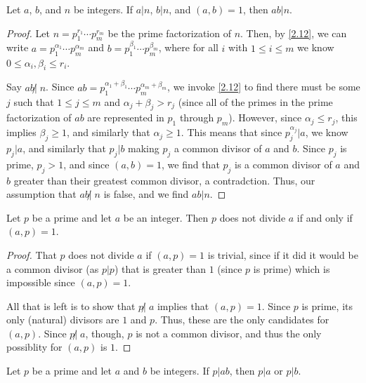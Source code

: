 \documentclass[../main.tex]{subfiles}
\begin{document}
\begin{thm} \label{2.25}
  Let $a$, $b$, and $n$ be integers. If $a|n$, $b|n$, and $(a, b) = 1$, then $ab | n$.
\end{thm}

\begin{proof}
  Let $n = p_1^{r_1} \cdots p_m^{r_m}$ be the prime factorization of $n$. Then, by \ref{2.12}, we can write $a = p_1^{\alpha_1} \cdots p_m^{\alpha_m}$ and $b = p_1^{\beta_1} \cdots p_m^{\beta_m}$, where for all $i$ with $1 \leq i \leq m$ we know $0 \leq \alpha_i, \beta_i \leq r_i$.

  Say $ab \not | \; n$. Since $ab = p_1^{\alpha_1 + \beta_1} \cdots p_m^{\alpha_m + \beta_m}$, we invoke \ref{2.12} to find there must be some $j$ such that $1 \leq j \leq m$ and $\alpha_j + \beta_j > r_j$ (since all of the primes in the prime factorization of $ab$ are represented in $p_1$ through $p_m$). However, since $\alpha_j \leq r_j$, this implies $\beta_j \geq 1$,
  and similarly that $\alpha_j \geq 1$. This means that since $p_j^{\alpha_j} | a$, we know $p_j | a$, and similarly that $p_j | b$ making $p_j$ a common divisor of $a$ and $b$. Since $p_j$ is prime, $p_j > 1$, and since $(a,b) = 1$, we find that $p_j$ is a common divisor of $a$ and $b$ greater than their greatest common divisor, a contradction. Thus, our assumption that $ab \not | \; n$ is false, and we find $ab | n$.
\end{proof}



\begin{thm} \label{2.26}
  Let $p$ be a prime and let $a$ be an integer. Then $p$ does not divide $a$ if and only if $(a, p) = 1$.
\end{thm}

\begin{proof}
  That $p$ does not divide $a$ if $(a, p) = 1$ is trivial, since if it did it would be a common divisor (as $p | p$) that is greater than $1$ (since $p$ is prime) which is impossible since $(a, p) = 1$.

  All that is left is to show that $p \not | \; a$ implies that $(a, p) = 1$. Since $p$ is prime, its only (natural) divisors are $1$ and $p$. Thus, these are the only candidates for $(a, p)$. Since $p \not | \; a$, though, $p$ is not a common divisor, and thus the only possiblity for $(a, p)$ is $1$.
\end{proof}



\begin{thm} \label{2.27}
  Let $p$ be a prime and let $a$ and $b$ be integers. If $p | ab$, then $p | a$ or $p | b$.
\end{thm}
\end{document}
